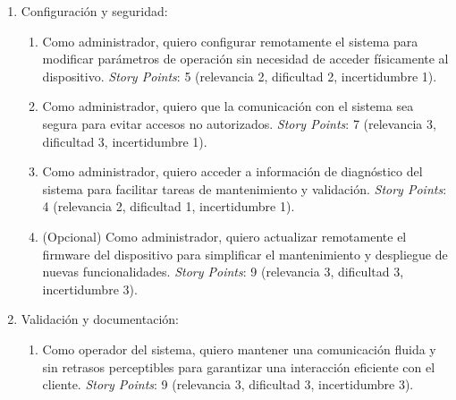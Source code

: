 \documentclass[
11pt, %
]{charter}
\newcommand{\storyPoints}{\textit{Story Points}}
\begin{document}
\begin{enumerate}
\begin{enumerate}
			\item Como administrador, quiero que el dispositivo recupere automáticamente la conexión Wi-Fi en caso de alguna interrupción para garantizar la continuidad operativa. \storyPoints{}: 4 (relevancia 2, dificultad 1, incertidumbre 1).
			
			\item Como administrador, quiero validar el desempeño del sistema bajo interferencia inalámbrica moderada para asegurar un funcionamiento estable en escenarios reales. \storyPoints{}: 7 (relevancia 2, dificultad 2, incertidumbre 3).
			
			\item (Opcional) Como administrador, quiero soportar múltiples ASP conectados simultáneamente para verificar la escalabilidad de la solución. \storyPoints{}: 7 (relevancia 3, dificultad 1, incertidumbre 3).

		\end{enumerate}
		
		
	\item Configuración y seguridad:
		\begin{enumerate}
			\item Como administrador, quiero configurar remotamente el sistema para modificar parámetros de operación sin necesidad de acceder físicamente al dispositivo. \storyPoints{}: 5 (relevancia 2, dificultad 2, incertidumbre 1).
			
			\item Como administrador, quiero que la comunicación con el sistema sea segura para evitar accesos no autorizados. \storyPoints{}: 7 (relevancia 3, dificultad 3, incertidumbre 1).
			
			\item Como administrador, quiero acceder a información de diagnóstico del sistema para facilitar tareas de mantenimiento y validación. \storyPoints{}: 4 (relevancia 2, dificultad 1, incertidumbre 1).
			
			\item (Opcional) Como administrador, quiero actualizar remotamente el firmware del dispositivo para simplificar el mantenimiento y despliegue de nuevas funcionalidades. \storyPoints{}: 9 (relevancia 3, dificultad 3, incertidumbre 3).
			
		\end{enumerate}			
	\item Validación y documentación:
	
		\begin{enumerate}
			\item Como operador del sistema, quiero mantener una comunicación fluida y sin retrasos perceptibles para garantizar una interacción eficiente con el cliente. \storyPoints{}: 9 (relevancia 3, dificultad 3, incertidumbre 3).
			

\end{enumerate}
\end{enumerate}
\end{document}
